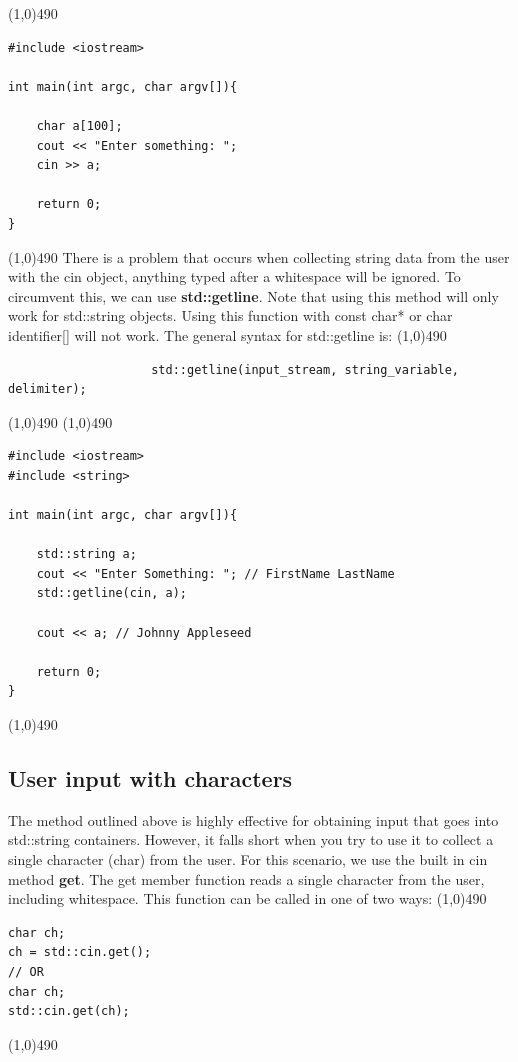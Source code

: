 \documentclass{report}
\begin{document}
        \bigbreak \noindent 
        \line(1,0){490}
        \begin{verbatim}
#include <iostream>

int main(int argc, char argv[]){

    char a[100];
    cout << "Enter something: ";
    cin >> a;

    return 0;
}
        \end{verbatim}
        \line(1,0){490}
    \bigbreak \noindent 
    \bigbreak \noindent 
    There is a problem that occurs when collecting string data from the user with the cin object, anything typed after a whitespace will be ignored. To circumvent this, we can use \textbf{std::getline}. Note that using this method will only work for std::string objects. Using this function with const char* or char identifier[] will not work.
    \bigbreak \noindent 
    The general syntax for std::getline is:
    \smallbreak \noindent
    \line(1,0){490}
    \begin{verbatim}
                    std::getline(input_stream, string_variable, delimiter);
    \end{verbatim}
    \bigbreak \noindent 
    \line(1,0){490}
    \bigbreak \noindent 
    \line(1,0){490}
    \begin{verbatim}
#include <iostream>
#include <string>

int main(int argc, char argv[]){

    std::string a;
    cout << "Enter Something: "; // FirstName LastName
    std::getline(cin, a);

    cout << a; // Johnny Appleseed

    return 0;
}
    \end{verbatim}
    \line(1,0){490}

    \pagebreak \bigbreak \noindent 
    \subsection{User input with characters}
    \bigbreak \noindent 
    The method outlined above is highly effective for obtaining input that goes into std::string containers. However, it falls short when you try to use it to collect a single character (char) from the user. 
    \bigbreak \noindent 
    For this scenario, we use the built in cin method \textbf{get}. The get member function reads a single character from the user, including whitespace. 
    \bigbreak \noindent 
    This function can be called in one of two ways:
    \smallbreak \noindent
    \line(1,0){490}
    \begin{verbatim}
char ch;
ch = std::cin.get();
// OR 
char ch;
std::cin.get(ch);
    \end{verbatim}
    \line(1,0){490}
\end{document}
